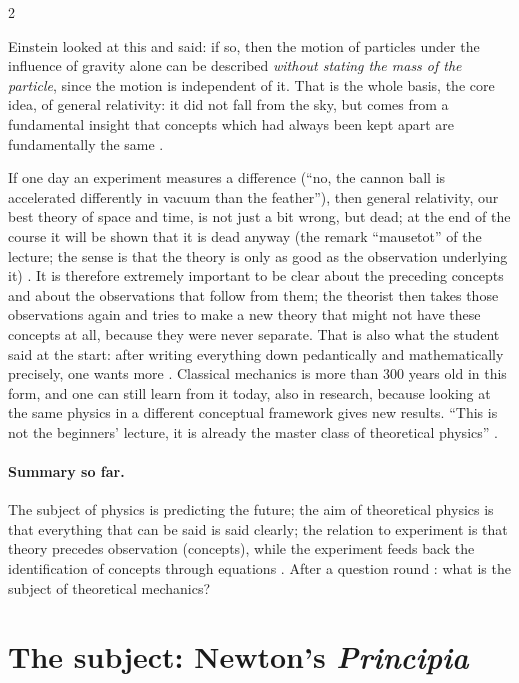 \begin{paracol}{2}
\begin{intuition}
Einstein looked at this and said: if so, then the motion of particles under the influence of gravity alone can be
described \emph{without stating the mass of the particle}, since the motion is independent of it. That is the whole
basis, the core idea, of general relativity: it did not fall from the sky, but comes from a fundamental insight that
concepts which had always been kept apart are fundamentally the same .
\end{intuition}
If one day an experiment measures a difference (``no, the cannon ball is accelerated differently in vacuum than the
feather''), then general relativity, our best theory of space and time, is not just a bit wrong, but dead; at the end
of the course it will be shown that it is dead anyway (the remark ``mausetot'' of the lecture; the sense is
that the theory is only as good as the observation underlying it) . It is therefore
extremely important to be clear about the preceding concepts and about the observations that follow from them;
the theorist then takes those observations again and tries to make a new theory that might not have these concepts at
all, because they were never separate. That is also what the student said at the start: after writing everything
down pedantically and mathematically precisely, one wants more .
Classical mechanics is more than 300 years old in this form, and one can still learn from it today, also in research,
because looking at the same physics in a different conceptual framework gives new results. ``This is not the
beginners' lecture, it is already the master class of theoretical physics'' .

\paragraph{Summary so far.} The subject of physics is predicting the future; the aim of theoretical physics is
that everything that can be said is said clearly; the relation to experiment is that theory precedes observation
(concepts), while the experiment feeds back the identification of concepts through equations
. After a question round : what is the subject of
theoretical mechanics?

\section{The subject: Newton's \emph{Principia}}\label{sec:bv-newton}


\end{paracol}
